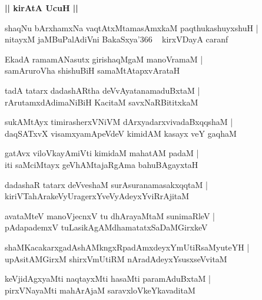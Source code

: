 \documentclass[twoside,12pt,openright]{book}
\newcounter{shloka}[chapter]
\def\uvaca#1{\centerline{{\large\textbf{#1}}}}
\begin{document}
\uvaca{|| kirAtA UcuH ||}

\begin{shloka}%
shaqNu bArxhamxNa  vaqtAtxMtamasAmxkaM paqthukashuyxshuH |\\
nitayxM jaMBuPalAdiVni BakaSxya\char'366 ~ kirxVDayA caranf 
\end{shloka}

\begin{shloka}%
EkadA ramamANasutx girishaqMgaM manoVramaM |\\
samAruroVha shishuBiH samaMtAtapxvArataH 
\end{shloka}

\begin{shloka}%
tadA tatarx dadashARtha deVvAyatanamaduBxtaM |\\
rArutamxdAdimaNiBiH KacitaM savxNaRBititxkaM 
\end{shloka}

\begin{shloka}%
sukAMtAyx timirasherxVNiVM dArxyadarxvivadaBxqqshaM  |\\
daqSATxvX visamxyamApeVdeV kimidAM kasayx veY gaqhaM 
\end{shloka}

\begin{shloka}%
gatAvx viloVkayAmiVti kimidaM mahatAM padaM |\\
iti saMciMtayx geVhAMtajaRgAma bahuBAgayxtaH 
\end{shloka}

\begin{shloka}%
dadashaR tatarx deVveshaM surAsuranamasakxqqtaM |\\
kiriVTahArakeVyUragerxYveVyAdeyxYviRrAjitaM 
\end{shloka}

\begin{shloka}%
avataMteV manoVjecnxV tu dhArayaMtaM sunimaRleV |\\
pAdapademxV tuLasikAgAMdhamatatxSaDaMGirxkeV 
\end{shloka}

\begin{shloka}%
shaMKacakarxgadAshAMkngxRpadAmxdeyxYmUtiRsaMyuteYH |\\
upAsitAMGirxM shirxVmUtiRM nAradAdeyxYsusxseVvitaM 
\end{shloka}

\begin{shloka}%
keVjidAgxyaMti naqtayxMti hasaMti paramAduBxtaM |\\
pirxVNayaMti mahArAjaM saravxloVkeYkavaditaM 
\end{shloka}
\end{document}
